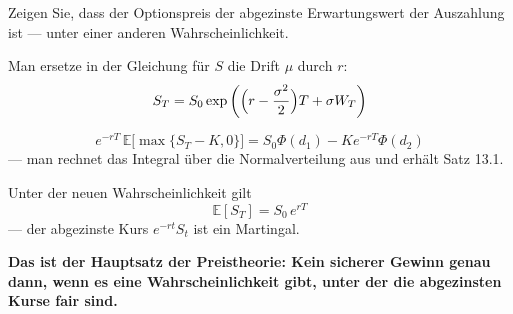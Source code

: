 \begin{aufgabe}
Zeigen Sie, dass der Optionspreis der abgezinste Erwartungswert der Auszahlung ist --- unter einer anderen Wahrscheinlichkeit.

\loesung
{}
Man ersetze in der Gleichung für $S$ die Drift $\mu$ durch $r$:
\[ S_T = S_0\exp\left(\Bigl(r-\frac{\sigma^{2}}{2}\Bigr)T + \sigma W_T\right) \]

\[ e^{-rT}\,\mathbb{E}\bigl[\max\{S_T-K,0\}\bigr] = S_0\Phi(d_1) - Ke^{-rT}\Phi(d_2) \]
--- man rechnet das Integral über die Normalverteilung aus und erhält Satz 13.1.

Unter der neuen Wahrscheinlichkeit gilt
\[ \mathbb{E}[S_T] = S_0\,e^{rT} \]
--- der abgezinste Kurs $e^{-rt}S_t$ ist ein Martingal.

\begin{center}
\begin{minipage}{0.9\textwidth}
\textbf{Das ist der Hauptsatz der Preistheorie: Kein sicherer Gewinn genau dann, wenn es eine Wahrscheinlichkeit gibt, unter der die abgezinsten Kurse fair sind.}
\end{minipage}
\end{center}

\begin{center}
\begin{minipage}{0.88\textwidth}
\end{minipage}
\end{center}
\end{aufgabe}

